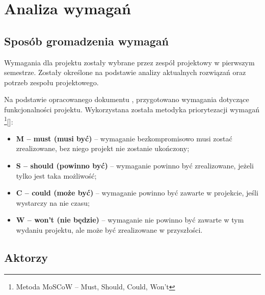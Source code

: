 \newgeometry{} %

\chapter{Analiza wymagań}
\label{ch:analiza-wymagan}

\section{Sposób gromadzenia wymagań}
\label{sec:sposob-gromadzenia-wymagan}

Wymagania dla projektu zostały wybrane przez zespół projektowy w pierwszym semestrze. Zostały określone na podstawie analizy aktualnych rozwiązań oraz potrzeb zespołu projektowego.

Na podstawie opracowanego dokumentu , przygotowano wymagania dotyczące funkcjonalności projektu. \newline Wykorzystana została metodyka priorytezacji wymagań \footnote{Metoda MoSCoW – Must, Should, Could, Won't}[]:
\begin{itemize}
    \item \textbf{M – must (musi być)} – wymaganie bezkompromisowo musi zostać zrealizowane, bez niego projekt nie zostanie ukończony;
    \item \textbf{S – should (powinno być)} – wymaganie powinno być zrealizowane, jeżeli tylko jest taka możliwość;
    \item \textbf{C – could (może być)} – wymaganie powinno być zawarte w projekcie, jeśli wystarczy na nie czasu;
    \item \textbf{W – won't (nie będzie)} – wymaganie nie powinno być zawarte w tym wydaniu projektu, ale może być zrealizowane w przyszłości.
\end{itemize}


\section{Aktorzy}
\label{sec:aktorzy}

\begin{stakeholder}[label={tab:stakeholder:someholder1},caption={opis udzialowca}]
\end{stakeholder}

